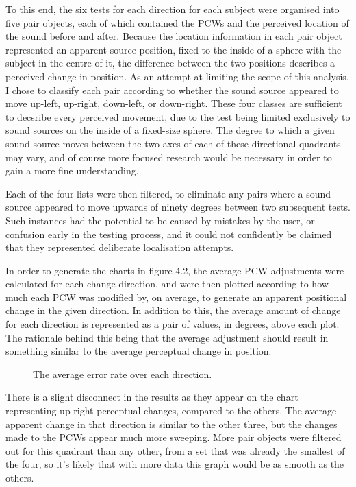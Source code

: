 To this end, the six tests for each direction for each subject were organised into five pair objects, each of which contained the PCWs and the perceived location of the sound before and after. Because the location information in each pair object represented an apparent source position, fixed to the inside of a sphere with the subject in the centre of it, the difference between the two positions describes a perceived change in position. As an attempt at limiting the scope of this analysis, I chose to classify each pair according to whether the sound source appeared to move up-left, up-right, down-left, or down-right. These four classes are sufficient to decsribe every perceived movement, due to the test being limited exclusively to sound sources on the inside of a fixed-size sphere. The degree to which a given sound source moves between the two axes of each of these directional quadrants may vary, and of course more focused research would be necessary in order to gain a more fine understanding.

Each of the four lists were then filtered, to eliminate any pairs where a sound source appeared to move upwards of ninety degrees between two subsequent tests. Such instances had the potential to be caused by mistakes by the user, or confusion early in the testing process, and it could not confidently be claimed that they represented deliberate localisation attempts. 

In order to generate the charts in figure 4.2, the average PCW adjustments were calculated for each change direction, and were then plotted according to how much each PCW was modified by, on average, to generate an apparent positional change in the given direction. In addition to this, the average amount of change for each direction is represented as a pair of values, in degrees, above each plot. The rationale behind this being that the average adjustment should result in something similar to the average perceptual change in position.

\begin{figure}
	\caption{The average error rate over each direction.}
\end{figure}

There is a slight disconnect in the results as they appear on the chart representing up-right perceptual changes, compared to the others. The average apparent change in that direction is similar to the other three, but the changes made to the PCWs appear much more sweeping. More pair objects were filtered out for this quadrant than any other, from a set that was already the smallest of the four, so it's likely that with more data this graph would be as smooth as the others. 


